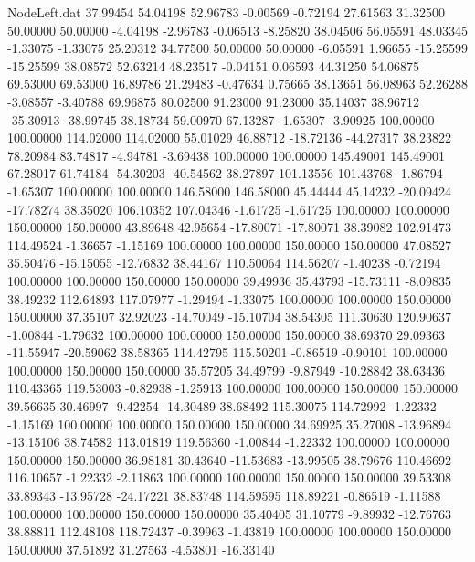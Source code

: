 \begin{filecontents}{NodeLeft.dat}
  37.99454   54.04198   52.96783    -0.00569   -0.72194   27.61563   31.32500   50.00000   50.00000   -4.04198   -2.96783   -0.06513   -8.25820
  38.04506   56.05591   48.03345    -1.33075   -1.33075   25.20312   34.77500   50.00000   50.00000   -6.05591    1.96655  -15.25599  -15.25599
  38.08572   52.63214   48.23517    -0.04151    0.06593   44.31250   54.06875   69.53000   69.53000   16.89786   21.29483   -0.47634    0.75665
  38.13651   56.08963   52.26288    -3.08557   -3.40788   69.96875   80.02500   91.23000   91.23000   35.14037   38.96712  -35.30913  -38.99745
  38.18734   59.00970   67.13287    -1.65307   -3.90925  100.00000  100.00000  114.02000  114.02000   55.01029   46.88712  -18.72136  -44.27317
  38.23822   78.20984   83.74817    -4.94781   -3.69438  100.00000  100.00000  145.49001  145.49001   67.28017   61.74184  -54.30203  -40.54562
  38.27897  101.13556  101.43768    -1.86794   -1.65307  100.00000  100.00000  146.58000  146.58000   45.44444   45.14232  -20.09424  -17.78274
  38.35020  106.10352  107.04346    -1.61725   -1.61725  100.00000  100.00000  150.00000  150.00000   43.89648   42.95654  -17.80071  -17.80071
  38.39082  102.91473  114.49524    -1.36657   -1.15169  100.00000  100.00000  150.00000  150.00000   47.08527   35.50476  -15.15055  -12.76832
  38.44167  110.50064  114.56207    -1.40238   -0.72194  100.00000  100.00000  150.00000  150.00000   39.49936   35.43793  -15.73111   -8.09835
  38.49232  112.64893  117.07977    -1.29494   -1.33075  100.00000  100.00000  150.00000  150.00000   37.35107   32.92023  -14.70049  -15.10704
  38.54305  111.30630  120.90637    -1.00844   -1.79632  100.00000  100.00000  150.00000  150.00000   38.69370   29.09363  -11.55947  -20.59062
  38.58365  114.42795  115.50201    -0.86519   -0.90101  100.00000  100.00000  150.00000  150.00000   35.57205   34.49799   -9.87949  -10.28842
  38.63436  110.43365  119.53003    -0.82938   -1.25913  100.00000  100.00000  150.00000  150.00000   39.56635   30.46997   -9.42254  -14.30489
  38.68492  115.30075  114.72992    -1.22332   -1.15169  100.00000  100.00000  150.00000  150.00000   34.69925   35.27008  -13.96894  -13.15106
  38.74582  113.01819  119.56360    -1.00844   -1.22332  100.00000  100.00000  150.00000  150.00000   36.98181   30.43640  -11.53683  -13.99505
  38.79676  110.46692  116.10657    -1.22332   -2.11863  100.00000  100.00000  150.00000  150.00000   39.53308   33.89343  -13.95728  -24.17221
  38.83748  114.59595  118.89221    -0.86519   -1.11588  100.00000  100.00000  150.00000  150.00000   35.40405   31.10779   -9.89932  -12.76763
  38.88811  112.48108  118.72437    -0.39963   -1.43819  100.00000  100.00000  150.00000  150.00000   37.51892   31.27563   -4.53801  -16.33140

\end{filecontents}
